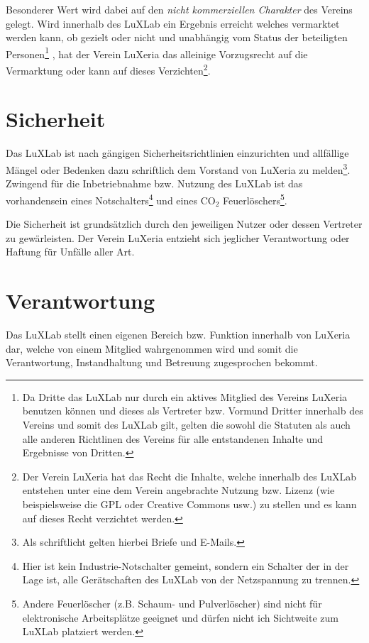 \documentclass[a4paper,
               10pt,
               fleqn]{article}
\begin{document}
Besonderer Wert wird dabei auf den \emph{nicht kommerziellen Charakter} des
Vereins gelegt. Wird innerhalb des LuXLab ein Ergebnis erreicht welches 
vermarktet werden kann, 
ob gezielt oder nicht und unabhängig vom Status der beteiligten Personen\footnote{
    Da Dritte das LuXLab nur durch ein aktives Mitglied des Vereins LuXeria
    benutzen können und dieses als Vertreter bzw. Vormund Dritter innerhalb des
    Vereins und somit des LuXLab gilt, gelten die sowohl die Statuten 
    als auch alle anderen Richtlinen des
    Vereins für alle entstandenen Inhalte und Ergebnisse von Dritten.}
, hat der Verein LuXeria das alleinige Vorzugsrecht auf die Vermarktung 
oder kann auf dieses Verzichten\footnote{Der Verein LuXeria hat das
    Recht die Inhalte, welche innerhalb des LuXLab entstehen unter
    eine dem Verein angebrachte Nutzung bzw. Lizenz (wie beispielsweise
    die GPL oder Creative Commons usw.) zu stellen und 
    es kann auf dieses Recht verzichtet werden.}.

\section{Sicherheit}
Das LuXLab ist nach gängigen Sicherheitsrichtlinien einzurichten und
allfällige Mängel oder Bedenken dazu schriftlich dem Vorstand von LuXeria
zu melden\footnote{
    Als schriftlicht gelten hierbei Briefe und E-Mails.}.
Zwingend für die Inbetriebnahme bzw. Nutzung des LuXLab ist das vorhandensein
eines Notschalters\footnote{
    Hier ist kein Industrie-Notschalter gemeint, sondern ein Schalter der
    in der Lage ist, alle Gerätschaften des LuXLab von der Netzspannung
    zu trennen.}
und eines CO$_2$ Feuerlöschers\footnote{
    Andere Feuerlöscher (z.B. Schaum- und Pulverlöscher) sind nicht für
    elektronische Arbeitsplätze geeignet und dürfen nicht ich Sichtweite
    zum LuXLab platziert werden.}.
    
Die Sicherheit ist grundsätzlich durch den jeweiligen Nutzer oder dessen
Vertreter zu gewärleisten.
Der Verein LuXeria entzieht sich jeglicher Verantwortung oder Haftung für 
Unfälle aller Art.

\section{Verantwortung}
Das LuXLab stellt einen eigenen Bereich bzw. Funktion innerhalb von LuXeria 
dar, welche von einem Mitglied wahrgenommen wird und somit die 
Verantwortung, Instandhaltung und Betreuung zugesprochen bekommt.
\end{document}
